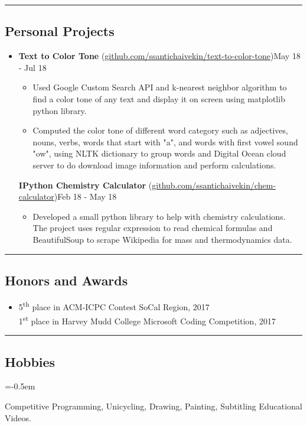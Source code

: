 \documentclass[10.5pt,letterpaper]{article}
\begin{document}
\hrule
\vspace{-1.0em}
\subsection*{Personal Projects}
  \begin{itemize}
    \parskip=-0.2em
    \item[]
    {\textbf{Text to Color Tone} (\href{https://github.com/ssantichaivekin/text-to-color-tone}{github.com/ssantichaivekin/text-to-color-tone})\hfill {May 18 - Jul 18}}
    \begin{itemize}[label=\textbullet]
        \item  Used Google Custom Search API and k-nearest neighbor algorithm to find a color tone of any text and display it on screen using matplotlib python library.
        \item  Computed the color tone of different word category such as adjectives, nouns, verbs, words that start with "a", and words with first vowel sound "ow", using NLTK dictionary to group words and Digital Ocean cloud server to do download image information and perform calculations.
    \end{itemize}
    {\textbf{IPython Chemistry Calculator} (\href{https://github.com/ssantichaivekin/chem-calculator}{github.com/ssantichaivekin/chem-calculator})\hfill {Feb 18 - May 18}}
    \begin{itemize}[label=\textbullet]
        \item  Developed a small python library to help with chemistry calculations. The project uses regular expression to read chemical formulas and BeautifulSoup to scrape Wikipedia for mass and thermodynamics data.
    \end{itemize}
  \end{itemize}

\hrule
\vspace{-1.0em}
\subsection*{Honors and Awards}
  \begin{itemize}
    \parskip=-0.5em
    \item[]
    {5\textsuperscript{th} place in ACM-ICPC Contest SoCal Region, 2017}\\
    {1\textsuperscript{st} place in Harvey Mudd College Microsoft Coding Competition, 2017}
  \end{itemize}

\hrule
\vspace{-1.0em}
\subsection*{Hobbies}
\begin{description}[labelindent=\parindent]
  \parskip=-0.5em
\item[] {Competitive Programming, Unicycling, Drawing, Painting, Subtitling Educational Videos.}
\end{description}
\end{document}

